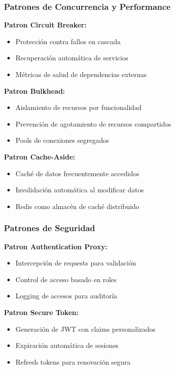\subsubsection{Patrones de Concurrencia y Performance}

\textbf{Patron Circuit Breaker:}
\begin{itemize}
\item Protección contra fallos en cascada
\item Recuperación automática de servicios
\item Métricas de salud de dependencias externas
\end{itemize}

\textbf{Patron Bulkhead:}
\begin{itemize}
\item Aislamiento de recursos por funcionalidad
\item Prevención de agotamiento de recursos compartidos
\item Pools de conexiones segregados
\end{itemize}

\textbf{Patron Cache-Aside:}
\begin{itemize}
\item Caché de datos frecuentemente accedidos
\item Invalidación automática al modificar datos
\item Redis como almacén de caché distribuido
\end{itemize}

\subsubsection{Patrones de Seguridad}

\textbf{Patron Authentication Proxy:}
\begin{itemize}
\item Intercepción de requests para validación
\item Control de acceso basado en roles
\item Logging de accesos para auditoría
\end{itemize}

\textbf{Patron Secure Token:}
\begin{itemize}
\item Generación de JWT con claims personalizados
\item Expiración automática de sesiones
\item Refresh tokens para renovación segura
\end{itemize}

